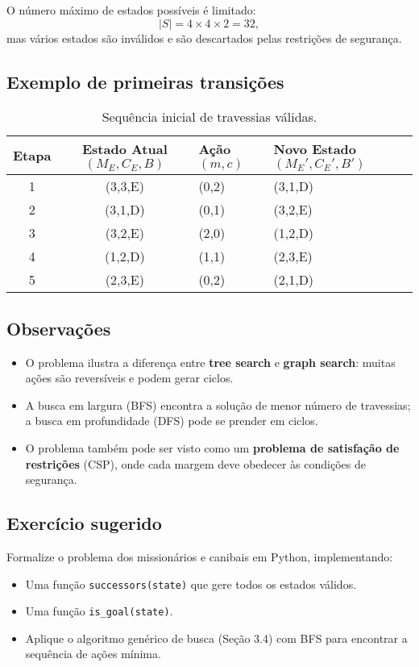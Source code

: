 \documentclass[9pt,a4paper]{extarticle}
\begin{document}
O número máximo de estados possíveis é limitado:
\[
|S| = 4 \times 4 \times 2 = 32,
\]
mas vários estados são inválidos e são descartados pelas restrições de segurança.

\subsection*{Exemplo de primeiras transições}

\begin{table}[h]
\centering
\small
\renewcommand{\arraystretch}{1.15}
\setlength{\tabcolsep}{4pt}
\begin{tabular}{@{}ccll@{}}
\toprule
\textbf{Etapa} & \textbf{Estado Atual $(M_E,C_E,B)$} & \textbf{Ação $(m,c)$} & \textbf{Novo Estado $(M_E',C_E',B')$} \\ \midrule
1 & (3,3,E) & (0,2) & (3,1,D) \\
2 & (3,1,D) & (0,1) & (3,2,E) \\
3 & (3,2,E) & (2,0) & (1,2,D) \\
4 & (1,2,D) & (1,1) & (2,3,E) \\
5 & (2,3,E) & (0,2) & (2,1,D) \\
\bottomrule
\end{tabular}
\caption{Sequência inicial de travessias válidas.}
\end{table}

\subsection*{Observações}

\begin{itemize}
  \item O problema ilustra a diferença entre \textbf{tree search} e \textbf{graph search}: muitas ações são reversíveis e podem gerar ciclos.
  \item A busca em largura (BFS) encontra a solução de menor número de travessias; a busca em profundidade (DFS) pode se prender em ciclos.
  \item O problema também pode ser visto como um \textbf{problema de satisfação de restrições} (CSP), onde cada margem deve obedecer às condições de segurança.
\end{itemize}

\subsection*{Exercício sugerido}

Formalize o problema dos missionários e canibais em Python, implementando:
\begin{itemize}
  \item Uma função \texttt{successors(state)} que gere todos os estados válidos.
  \item Uma função \texttt{is\_goal(state)}.
  \item Aplique o algoritmo genérico de busca (Seção 3.4) com BFS para encontrar a sequência de ações mínima.
\end{itemize}
\end{document}
